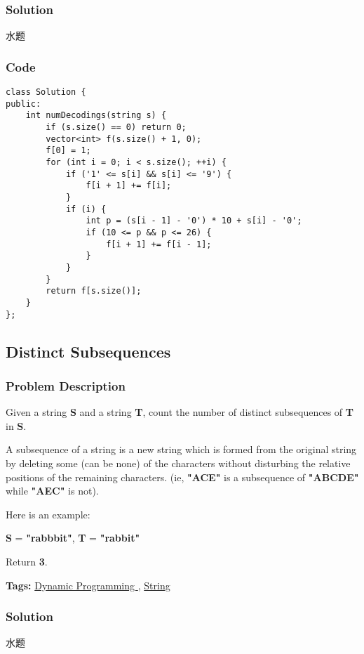\documentclass{article}
\begin{document}
\begin{CJK*}{UTF8}{gkai}
\subsubsection*{Solution}
水题

\subsubsection*{Code}
\begin{lstlisting}
class Solution {
public:
    int numDecodings(string s) {
        if (s.size() == 0) return 0;
        vector<int> f(s.size() + 1, 0);
        f[0] = 1;
        for (int i = 0; i < s.size(); ++i) {
            if ('1' <= s[i] && s[i] <= '9') {
                f[i + 1] += f[i];
            }
            if (i) {
                int p = (s[i - 1] - '0') * 10 + s[i] - '0';
                if (10 <= p && p <= 26) {
                    f[i + 1] += f[i - 1];
                }
            }
        }
        return f[s.size()];
    }
}; 
\end{lstlisting}


\subsection{ Distinct Subsequences }
\label{ Distinct Subsequences }

\subsubsection*{Problem Description}
Given a string \textbf{S} and a string \textbf{T}, count the number of distinct subsequences of \textbf{T} in \textbf{S}.

A subsequence of a string is a new string which is formed from the original string by deleting some (can be none) of the characters without disturbing the relative positions of the remaining characters. (ie, \textbf{"ACE"} is a subsequence of \textbf{"ABCDE"} while \textbf{"AEC"} is not).

Here is an example:


\textbf{S} = \textbf{"rabbbit"}, \textbf{T} = \textbf{"rabbit"}

Return \textbf{3}.


\textbf{Tags: }
\hyperref[ Dynamic Programming ]{ Dynamic Programming },  \hyperref[ String ]{ String }



\subsubsection*{Solution}
水题


\end{CJK*}
\end{document}
